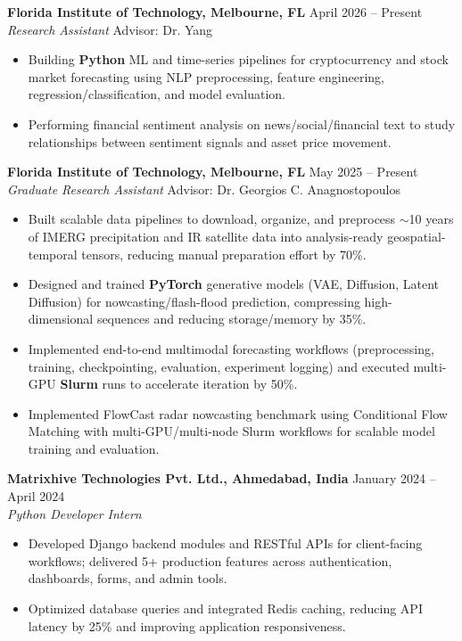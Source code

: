 \documentclass[a4paper,10pt]{article}
\newcommand{\resumeSubheading}[4]{
    \textbf{#1} \hfill #2\\
    \textit{#3} \hfill #4
}
\begin{document}
\resumeSubheading
{Florida Institute of Technology, Melbourne, FL}
{April 2026 -- Present}
{Research Assistant}
{Advisor: Dr. Yang}
\begin{itemize}
    \item Building \textbf{Python} ML and time-series pipelines for cryptocurrency and stock market forecasting using NLP preprocessing, feature engineering, regression/classification, and model evaluation.
    \item Performing financial sentiment analysis on news/social/financial text to study relationships between sentiment signals and asset price movement.
\end{itemize}

\resumeSubheading
{Florida Institute of Technology, Melbourne, FL}
{May 2025 -- Present}
{Graduate Research Assistant}
{Advisor: Dr. Georgios C. Anagnostopoulos}
\begin{itemize}
    \item Built scalable data pipelines to download, organize, and preprocess $\sim$10 years of IMERG precipitation and IR satellite data into analysis-ready geospatial-temporal tensors, reducing manual preparation effort by 70\%.
    \item Designed and trained \textbf{PyTorch} generative models (VAE, Diffusion, Latent Diffusion) for nowcasting/flash-flood prediction, compressing high-dimensional sequences and reducing storage/memory by 35\%.
    \item Implemented end-to-end multimodal forecasting workflows (preprocessing, training, checkpointing, evaluation, experiment logging) and executed multi-GPU \textbf{Slurm} runs to accelerate iteration by 50\%.
    \item Implemented FlowCast radar nowcasting benchmark using Conditional Flow Matching with multi-GPU/multi-node Slurm workflows for scalable model training and evaluation.
\end{itemize}

\resumeSubheading
{Matrixhive Technologies Pvt. Ltd., Ahmedabad, India}
{January 2024 -- April 2024}
{Python Developer Intern}
{}
\begin{itemize}
    \item Developed Django backend modules and RESTful APIs for client-facing workflows; delivered 5+ production features across authentication, dashboards, forms, and admin tools.
    \item Optimized database queries and integrated Redis caching, reducing API latency by 25\% and improving application responsiveness.
\end{itemize}
\end{document}
